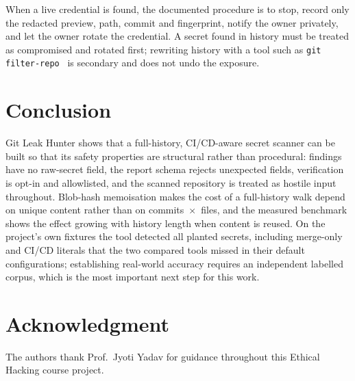 \documentclass[conference]{IEEEtran}
\newcommand{\tool}{Git Leak Hunter}
\newcommand{\code}[1]{\texttt{#1}}
\begin{document}
When a live credential is found, the documented procedure is to stop, record only the redacted
preview, path, commit and fingerprint, notify the owner privately, and let the owner rotate the
credential. A secret found in history must be treated as compromised and rotated first; rewriting
history with a tool such as \code{git filter-repo}~\cite{filterrepo} is secondary and does not undo
the exposure.

\section{Conclusion}

\tool{} shows that a full-history, CI/CD-aware secret scanner can be built so that its safety
properties are structural rather than procedural: findings have no raw-secret field, the report
schema rejects unexpected fields, verification is opt-in and allowlisted, and the scanned
repository is treated as hostile input throughout. Blob-hash memoisation makes the cost of a
full-history walk depend on unique content rather than on commits~$\times$~files, and the measured
benchmark shows the effect growing with history length when content is reused. On the project's
own fixtures the tool detected all planted secrets, including merge-only and CI/CD literals that
the two compared tools missed in their default configurations; establishing real-world accuracy
requires an independent labelled corpus, which is the most important next step for this work.

\section*{Acknowledgment}
The authors thank Prof.\ Jyoti Yadav for guidance throughout this Ethical Hacking course project.
\end{document}
